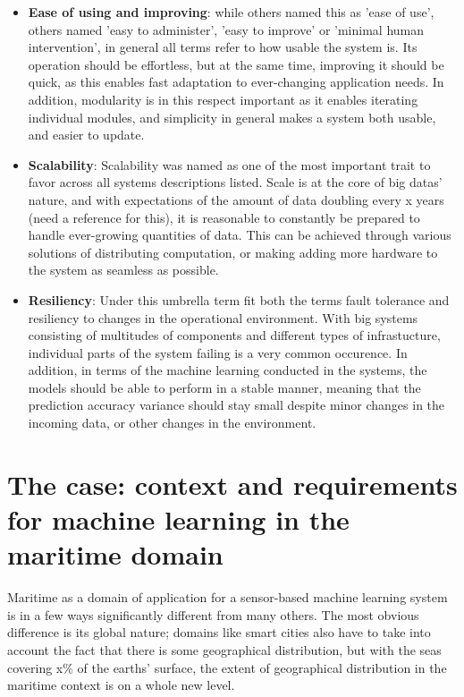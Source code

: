 \begin{itemize}
    \item \textbf{Ease of using and improving}: while others named this as 'ease of use', others named 'easy to administer', 'easy to improve' or 'minimal human intervention', in general all terms refer to how usable the system is. Its operation should be effortless, but at the same time, improving it should be quick, as this enables fast adaptation to ever-changing application needs. In addition, modularity is in this respect important as it enables iterating individual modules, and simplicity in general makes a system both usable, and easier to update.
    \item \textbf{Scalability}: Scalability was named as one of the most important trait to favor across all systems descriptions listed. Scale is at the core of big datas' nature, and with expectations of the amount of data doubling every x years (need a reference for this), it is reasonable to constantly be prepared to handle ever-growing quantities of data. This can be achieved through various solutions of distributing computation, or making adding more hardware to the system as seamless as possible.
    \item \textbf{Resiliency}: Under this umbrella term fit both the terms fault tolerance and resiliency to changes in the operational environment. With big systems consisting of multitudes of components and different types of infrastucture, individual parts of the system failing is a very common occurence. In addition, in terms of the machine learning conducted in the systems, the models should be able to perform in a stable manner, meaning that the prediction accuracy variance should stay small despite minor changes in the incoming data, or other changes in the environment.
\end{itemize}

\section{The case: context and requirements for machine learning in the maritime domain}

Maritime as a domain of application for a sensor-based machine learning system is in a few ways significantly different from many others. The most obvious difference is its global nature; domains like smart cities also have to take into account the fact that there is some geographical distribution, but with the seas covering x\% of the earths' surface, the extent of geographical distribution in the maritime context is on a whole new level.

